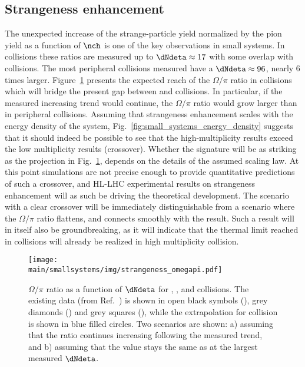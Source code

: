 \documentclass[../report.tex]{subfiles}
\providecommand{\main}{..}
\begin{document}
\subsection{Strangeness enhancement}
\label{sect:smallsystems_strangeness}

The unexpected increase of the strange-particle yield normalized by the pion yield as a function of $\nch$ is one of the key observations in small systems. In \pp collisions these ratios are measured up to $\dNdeta \approx 17$ with some overlap with \pPb collisions. The most peripheral \PbPb collisions measured have a $\dNdeta \approx 96$, nearly 6 times larger. Figure~\ref{fig:smallsystems_strangeness_omega_pi} presents the expected reach of the $\Omega/\pi$ ratio in \pp collisions which will bridge the present gap between \pp and \PbPb collisions. In particular, if the measured increasing trend would continue, the $\Omega/\pi$ ratio would grow larger than in peripheral \PbPb collisions. 
Assuming that strangeness enhancement scales with the energy density of the system, Fig.~\ref{fig:small_systems_energy_density} suggests that it should indeed be possible to see that the high-multiplicity \pp results exceed the low multiplicity \PbPb results (crossover). Whether the signature will be as striking as the projection in Fig.~\ref{fig:smallsystems_strangeness_omega_pi}, depends on the details of the assumed scaling law. At this point simulations are not precise enough to provide quantitative predictions of such a crossover, and HL-LHC experimental results on strangeness enhancement will as such be driving the theoretical development.
The scenario with a clear crossover will be immediately distinguishable from a scenario where the $\Omega/\pi$ ratio flattens, and connects smoothly with the \PbPb result. Such a result will in itself also be groundbreaking, as it will indicate that the thermal limit reached in \PbPb collisions will already be realized in high multiplicity \pp collision.

\begin{figure}[t]
\centering
\texttt{[image: \\main/smallsystems/img/strangeness\_omegapi.pdf]}

\caption{$\Omega/\pi$ ratio as a function of $\dNdeta$ for \pp, \pPb, and \PbPb collisions. The existing data (from Ref.~\cite{ALICE:2017jyt}) is shown in open black symbols (\pp), grey diamonds (\pPb) and grey squares (\PbPb), while the extrapolation for \pp collision is shown in blue filled circles. Two scenarios are shown: a) assuming that the ratio continues increasing following the measured trend, and b) assuming that the value stays the same as at the largest measured $\dNdeta$.}
\label{fig:smallsystems_strangeness_omega_pi}
\end{figure}
\end{document}
